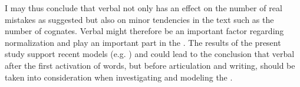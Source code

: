 \documentclass[output=paper]{LSP/langsci}
\begin{document}
I may thus conclude that verbal  not only has an effect on the number of real mistakes as \citet{Levelt1999} suggested but also on minor tendencies in the text such as the number of cognates. Verbal  might therefore be an important factor regarding normalization and play an important part in the . The results of the present study support recent  models (e.g. \citealt{TirkkonenCondit2005}) and could lead to the conclusion that verbal  after the first activation of words, but before articulation and writing, should be taken into consideration when investigating and modeling the .

\newpage
\sloppy
\printbibliography[heading=subbibliography,notkeyword=this]
\end{document}
